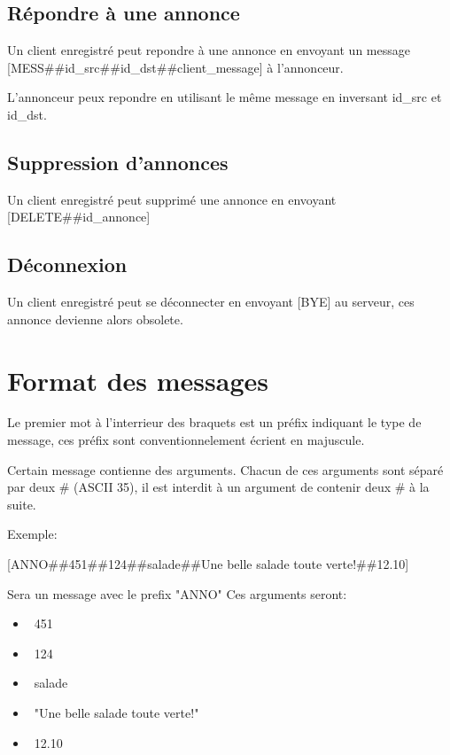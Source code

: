 \documentclass[12pt]{article}
\begin{document}
\subsection{Répondre à une annonce}

Un client enregistré peut repondre à une annonce en envoyant un message [MESS\#\#id\_src\#\#id\_dst\#\#client\_message] à l'annonceur.

L'annonceur peux repondre en utilisant le même message en inversant id\_src et id\_dst.



\subsection{Suppression d'annonces}

Un client enregistré peut supprimé une annonce en envoyant [DELETE\#\#id\_annonce]


\subsection{Déconnexion}

Un client enregistré peut se déconnecter en envoyant [BYE] au serveur, ces annonce devienne alors obsolete.

\section{Format des messages}


Le premier mot à l'interrieur des braquets est un préfix indiquant le type de message, ces préfix sont conventionnelement écrient en majuscule.

Certain message contienne des arguments. Chacun de ces arguments sont séparé par deux \# (ASCII 35), 
il est interdit à un argument de contenir deux \# à la suite.

Exemple: 

[ANNO\#\#451\#\#124\#\#salade\#\#Une belle salade toute verte!\#\#12.10] 

Sera un message avec le prefix "ANNO"
Ces arguments seront:
\begin{itemize}
  \item~451
  \item~124
  \item~salade
  \item~"Une belle salade toute verte!"
  \item~12.10
\end{itemize}
\end{document}
